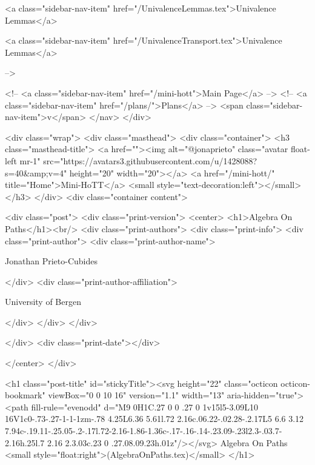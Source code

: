      
    
      
        
          <a class="sidebar-nav-item" href="/UnivalenceLemmas.tex">Univalence Lemmas</a>
        
      
    
      
        
          <a class="sidebar-nav-item" href="/UnivalenceTransport.tex">Univalence Lemmas</a>
        
      
     -->

    <!-- <a class="sidebar-nav-item" href="/mini-hott">Main Page</a> -->
    <!-- <a class="sidebar-nav-item" href="/plans/">Plans</a> -->
    <span class="sidebar-nav-item">v</span>
  </nav>
</div>

    <div class="wrap">
      <div class="masthead">
        <div class="container">
          <h3 class="masthead-title">
            <a href=""><img alt="@jonaprieto" class="avatar float-left mr-1" src="https://avatars3.githubusercontent.com/u/1428088?s=40&amp;v=4" height="20" width="20"></a>
            <a href="/mini-hott/" title="Home">Mini-HoTT</a>
            <small style="text-decoration:left"></small>
          </h3>
        </div>
      <div class="container content">
        







<div class="post">
  <div class="print-version">
    <center>
      <h1>Algebra On Paths</h1><br/>
        <div class="print-authors">
          <div class="print-info">
            <div class="print-author">
              <div class="print-author-name">
                
                  Jonathan Prieto-Cubides
                
              </div>
              <div class="print-author-affiliation">
                
                  University of Bergen
                
                </div>
            </div>
          </div>
          
          
        </div>
        <div class="print-date"></div>
        
        
    </center>
  </div>

  

  <h1 class="post-title" id="stickyTitle"><svg height="22" class="octicon octicon-bookmark" viewBox="0 0 10 16" version="1.1" width="13" aria-hidden="true"><path fill-rule="evenodd" d="M9 0H1C.27 0 0 .27 0 1v15l5-3.09L10 16V1c0-.73-.27-1-1-1zm-.78 4.25L6.36 5.61l.72 2.16c.06.22-.02.28-.2.17L5 6.6 3.12 7.94c-.19.11-.25.05-.2-.17l.72-2.16-1.86-1.36c-.17-.16-.14-.23.09-.23l2.3-.03.7-2.16h.25l.7 2.16 2.3.03c.23 0 .27.08.09.23h.01z"/></svg> Algebra On Paths <small style="float:right">(AlgebraOnPaths.tex)</small>
  </h1>

